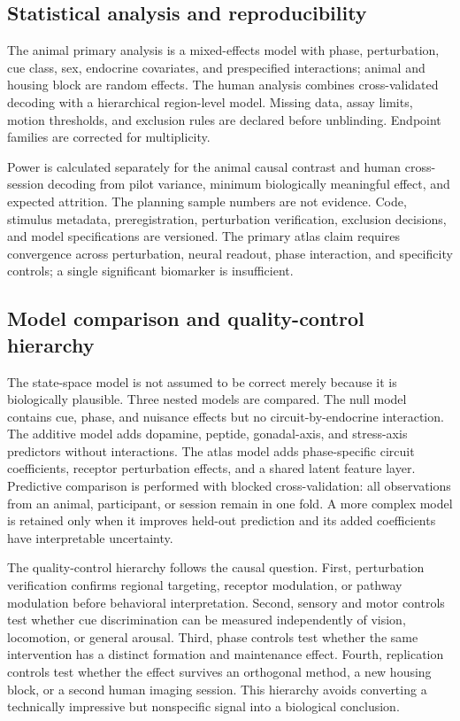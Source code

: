 \documentclass[conference]{IEEEtran}
\begin{document}
\subsection{Statistical analysis and reproducibility}
The animal primary analysis is a mixed-effects model with phase, perturbation, cue class, sex, endocrine covariates, and prespecified interactions; animal and housing block are random effects. The human analysis combines cross-validated decoding with a hierarchical region-level model. Missing data, assay limits, motion thresholds, and exclusion rules are declared before unblinding. Endpoint families are corrected for multiplicity.

Power is calculated separately for the animal causal contrast and human cross-session decoding from pilot variance, minimum biologically meaningful effect, and expected attrition. The planning sample numbers are not evidence. Code, stimulus metadata, preregistration, perturbation verification, exclusion decisions, and model specifications are versioned. The primary atlas claim requires convergence across perturbation, neural readout, phase interaction, and specificity controls; a single significant biomarker is insufficient.

\subsection{Model comparison and quality-control hierarchy}
The state-space model is not assumed to be correct merely because it is biologically plausible. Three nested models are compared. The null model contains cue, phase, and nuisance effects but no circuit-by-endocrine interaction. The additive model adds dopamine, peptide, gonadal-axis, and stress-axis predictors without interactions. The atlas model adds phase-specific circuit coefficients, receptor perturbation effects, and a shared latent feature layer. Predictive comparison is performed with blocked cross-validation: all observations from an animal, participant, or session remain in one fold. A more complex model is retained only when it improves held-out prediction and its added coefficients have interpretable uncertainty.

The quality-control hierarchy follows the causal question. First, perturbation verification confirms regional targeting, receptor modulation, or pathway modulation before behavioral interpretation. Second, sensory and motor controls test whether cue discrimination can be measured independently of vision, locomotion, or general arousal. Third, phase controls test whether the same intervention has a distinct formation and maintenance effect. Fourth, replication controls test whether the effect survives an orthogonal method, a new housing block, or a second human imaging session. This hierarchy avoids converting a technically impressive but nonspecific signal into a biological conclusion.
\end{document}
